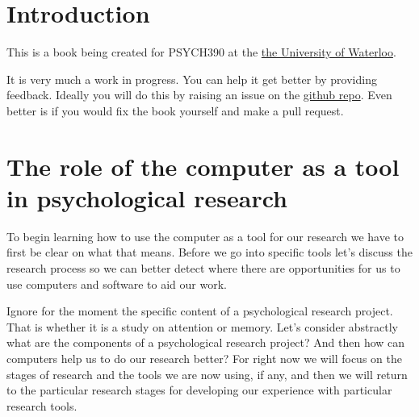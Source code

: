 \documentclass[
  letterpaper,
  DIV=11,
  numbers=noendperiod]{scrreprt}
\begin{document}

\chapter{Introduction}\label{introduction}

This is a book being created for PSYCH390 at the
\href{https://uwaterloo.ca}{the University of Waterloo}.

It is very much a work in progress. You can help it get better by
providing feedback. Ideally you will do this by raising an issue on the
\href{https://github.com/brittAnderson/uwlooP390}{github repo}. Even
better is if you would fix the book yourself and make a pull request.


\chapter{The role of the computer as a tool in psychological
research}\label{the-role-of-the-computer-as-a-tool-in-psychological-research}

To begin learning how to use the computer as a tool for our research we
have to first be clear on what that means. Before we go into specific
tools let's discuss the research process so we can better detect where
there are opportunities for us to use computers and software to aid our
work.

\begin{tcolorbox}[enhanced jigsaw, opacityback=0, leftrule=.75mm, colback=white, left=2mm, titlerule=0mm, toprule=.15mm, toptitle=1mm, coltitle=black, title=\textcolor{quarto-callout-tip-color}{\faLightbulb}\hspace{0.5em}{Class Question}, opacitybacktitle=0.6, colbacktitle=quarto-callout-tip-color!10!white, breakable, bottomrule=.15mm, bottomtitle=1mm, colframe=quarto-callout-tip-color-frame, arc=.35mm, rightrule=.15mm]

Ignore for the moment the specific content of a psychological research
project. That is whether it is a study on attention or memory. Let's
consider abstractly what are the components of a psychological research
project? And then how can computers help us to do our research better?
For right now we will focus on the stages of research and the tools we
are now using, if any, and then we will return to the particular
research stages for developing our experience with particular research
tools.

\end{tcolorbox}
\end{document}
